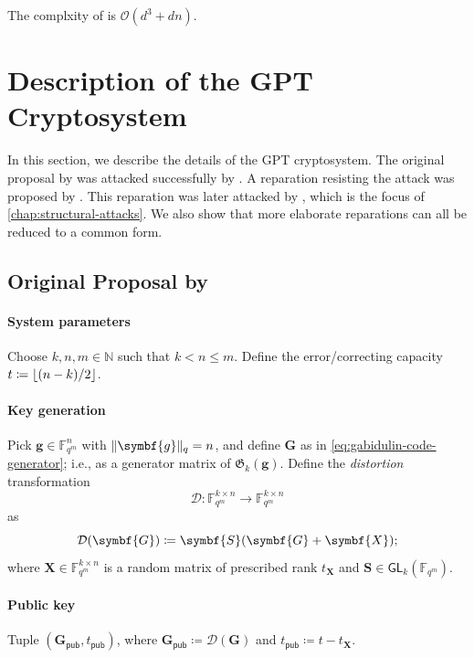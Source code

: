 \documentclass[version=last, paper=A4, parskip=half, oneside,%
toc=bibliography, toc=listof, listof=leveldown]{scrbook}
\theoremstyle{plain}
\theoremstyle{definition}
\theoremstyle{remark}
\renewcommand*{\vec}{\symbf}
\newcommand*{\mat}{\symbf}
\newcommand*{\GL}{\ensuremath{\mathsf{GL}}}
\newcommand*{\pub}{\ensuremath{\mathsf{pub}}}
\newcommand*{\FF}{\ensuremath{\mathbb{F}}}
\newcommand*{\NN}{\ensuremath{\mathbb{N}}}
\newcommand*{\Gab}{\ensuremath{\mathfrak{G}}}
\DeclarePairedDelimiter{\floor}{\lfloor}{\rfloor}
\DeclarePairedDelimiter{\norm}{\lVert}{\rVert}
\newcommand*{\normR}[2]{\ensuremath{\norm{#1}_{#2}}}
\begin{document}
The complxity of  is
\(\mathcal{O}(d^3 + d n)\).

\section{Description of the GPT Cryptosystem}

In this section, we describe the details of the GPT cryptosystem.  The original
proposal by \textcite{GPT91} was attacked successfully by \textcite{Gib95,
  Gib96}.  A reparation resisting the attack was proposed by \textcite{GO01}.
This reparation was later attacked by \textcite{Ove05, Ove06, Ove08}, which is
the focus of \cref{chap:structural-attacks}.  We also show that more elaborate
reparations can all be reduced to a common form.

\subsection{Original Proposal by \texorpdfstring{\textcite{GPT91}}{Gabidulin,
    Paramonov, and Tretjakov}}

\paragraph{System parameters} Choose \(k, n, m \in \NN\) such that
\(k < n \le m\).  Define the error\-/correcting capacity
\(t \coloneqq \floor{(n - k) / {2}}\).

\paragraph{Key generation} Pick \(\vec{g} \in \FF_{q^m}^n\) with
\(\normR{\vec{g}}{q} = n\), and define \(\mat{G}\) as in
\cref{eq:gabidulin-code-generator}; i.e., as a generator matrix of
\(\Gab_k(\vec{g})\).  Define the \emph{distortion} transformation
\[
  \mathcal{D}\colon \FF_{q^m}^{k \times n} \to \FF_{q^m}^{k \times n}
\]
as
\[
  \mathcal{D}(\mat{G}) \coloneqq \mat{S}(\mat{G} + \mat{X})\text;
\]
where \(\mat{X} \in \FF_{q^m}^{k \times n}\) is a random matrix of prescribed
rank \(t_{\mat{X}}\) and \(\mat{S} \in \GL_k(\FF_{q^m})\).

\paragraph{Public key} Tuple \((\mat{G}_{\pub}, t_{\pub})\), where
\(\mat{G}_{\pub} \coloneqq \mathcal{D}(\mat{G})\) and
\(t_{\pub} \coloneqq t - t_{\mat{X}}\).
\end{document}
